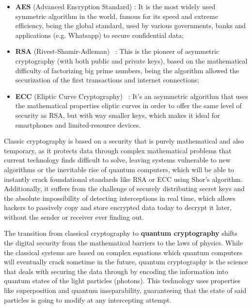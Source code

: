 \documentclass[12pt, a4paper]{article}
\begin{document}
\begin{itemize}
    \item \textbf{AES} (Advanced Encryption Standard) \cite{aes2001}: It is the most widely used symmetric algorithm in the world, famous for its speed and extreme efficiency, being the global standard, used by various governments, banks and applications (e.g. Whatsapp) to secure confidential data;

    \item \textbf{RSA} (Rivest-Shamir-Adleman) ~\cite{rsa1978}: This is the pioneer of asymmetric cryptography (with both public and private keys), based on the mathematical difficulty of factorizing big prime numbers, being the algorithm allowed the securization of the first transactions and internet connections;

    \item \textbf{ECC} (Eliptic Curve Cryptography) ~\cite{ecc1985}: It's an asymmetric algorithm that uses the mathematical properties eliptic curves in order to offer the same level of security as RSA, but with way smaller keys, which makes it ideal for smartphones and limited-resource devices.
\end{itemize}

Classic cryptography is based on a security that is purely mathematical and also temporary, as it protects data through complex mathematical problems that current technology finds difficult to solve, leaving systems vulnerable to new algorithms or the inevitable rise of quantum computers, which will be able to instantly crack foundational standards like RSA or ECC using Shor's algorithm. Additionally, it suffers from the challenge of securely distributing secret keys and the absolute impossibility of detecting interceptions in real time, which allows hackers to passively copy and store encrypted data today to decrypt it later, without the sender or receiver ever finding out.

The transition from classical cryptography to \textbf{quantum cryptography} shifts the digital security from the mathematical barriers to the laws of physics. While the classical systems are based on complex equations which quantum computers will eventually crack sometime in the future, quantum cryptography is the science that deals with securing the data through by encoding the information into quantum states of the light particles (photons). This technology uses properties like superposition and quantum inseparability, guaranteeing that the state of said particles is going to modify at any intercepting attempt.
\end{document}
